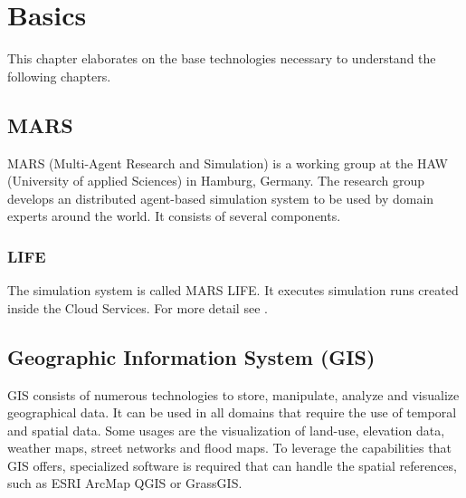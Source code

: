 
\chapter{Basics}
This chapter elaborates on the base technologies necessary to understand the following chapters.



\section{MARS}
MARS (Multi-Agent Research and Simulation) is a working group at the HAW (University of applied Sciences) in Hamburg, Germany. The research group develops an distributed agent-based simulation system to be used by domain experts around the world. It consists of several components.


\subsection{LIFE}
The simulation system is called MARS LIFE. It executes simulation runs created inside the Cloud Services. For more detail see \cite{Huning2016}.


%
%



\section{Geographic Information System (GIS)}
GIS consists of numerous technologies to store, manipulate, analyze and visualize geographical data. It can be used in all domains that require the use of temporal and spatial data. Some usages are the visualization of land-use, elevation data, weather maps, street networks and flood maps. To leverage the capabilities that GIS offers, specialized software is required that can handle the spatial references, such as ESRI ArcMap QGIS or GrassGIS.



